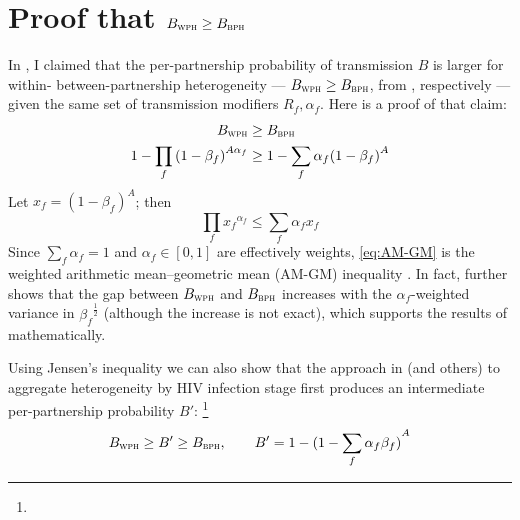 \section{Proof that $B_{\textsc{wph}} \ge B_{\textsc{bph}}$}\label{app.foi.proof}
In , I claimed that
the per-partnership probability of transmission $B$ is larger for
within- \vs between-partnership heterogeneity
--- $B_{\textsc{wph}} \ge B_{\textsc{bph}}$, from , respectively ---
given the same set of transmission modifiers $R_f, \alpha_f$.
Here is a proof of that claim:
\begin{equation}
  \begin{aligned}
    B_{\textsc{wph}} &\ge B_{\textsc{bph}} \\
    1 - \prod_f {(1 - \beta_f)}^{A\alpha_f} &\ge 1 - \sum_f \alpha_f {(1 - \beta_f)}^{A}
  \end{aligned}
\end{equation}
Let $x_f = {(1 - \beta_f)}^A$; then
\begin{equation}\label{eq:AM-GM}
  \prod_f {x_f}^{\alpha_f} \le \sum_f \alpha_f x_f
\end{equation}
Since $\sum_f \alpha_f = 1$ and $\alpha_f \in [0,1]$ are effectively weights,
\eqref{eq:AM-GM} is the weighted arithmetic mean--geometric mean (AM-GM) inequality \cite{Aldaz2009}.
In fact, \citet{Aldaz2009} further shows that the gap between $B_{\textsc{wph}}$ and $B_{\textsc{bph}}$
increases with the $\alpha_f$-weighted variance in ${\beta_f}^{\frac12}$
(although the increase is not exact),
which supports the results of  mathematically.
\par
Using Jensen's inequality \cite{Jensen1906} we can also show that
the approach in \cite{Kerr2015} (and others)
to aggregate heterogeneity by HIV infection stage first
produces an intermediate per-partnership probability $B'$:%
\footnote{}
\begin{equation}
  B_{\textsc{wph}} \ge B' \ge B_{\textsc{bph}},
  \qquad B' = 1 - {(1 - \sum_f \alpha_f \beta_f)}^{A}
\end{equation}
